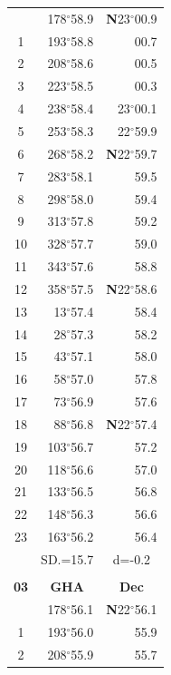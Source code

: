 \documentclass[10pt, a4paper]{report}
\begin{document}
\begin{scriptsize}
\begin{tabular*}{0.2\textwidth}[t]{@{\extracolsep{\fill}}|c|rr|}
\hline\rule{0pt}{2.6ex}\noindent
0 & 178$^\circ$58.9 & \textbf{N}23$^\circ$00.9\\
1 & 193$^\circ$58.8 & 00.7\\
2 & 208$^\circ$58.6 & 00.5\\
3 & 223$^\circ$58.5 & \raisebox{0.24ex}{\boldmath$\cdot$~\boldmath$\cdot$~~}00.3\\
4 & 238$^\circ$58.4 & 23$^\circ$00.1\\
5 & 253$^\circ$58.3 & 22$^\circ$59.9\\[2Pt]
6 & 268$^\circ$58.2 & \textbf{N}22$^\circ$59.7\\
7 & 283$^\circ$58.1 & 59.5\\
8 & 298$^\circ$58.0 & 59.4\\
9 & 313$^\circ$57.8 & \raisebox{0.24ex}{\boldmath$\cdot$~\boldmath$\cdot$~~}59.2\\
10 & 328$^\circ$57.7 & 59.0\\
11 & 343$^\circ$57.6 & 58.8\\[2Pt]
12 & 358$^\circ$57.5 & \textbf{N}22$^\circ$58.6\\
13 & 13$^\circ$57.4 & 58.4\\
14 & 28$^\circ$57.3 & 58.2\\
15 & 43$^\circ$57.1 & \raisebox{0.24ex}{\boldmath$\cdot$~\boldmath$\cdot$~~}58.0\\
16 & 58$^\circ$57.0 & 57.8\\
17 & 73$^\circ$56.9 & 57.6\\[2Pt]
18 & 88$^\circ$56.8 & \textbf{N}22$^\circ$57.4\\
19 & 103$^\circ$56.7 & 57.2\\
20 & 118$^\circ$56.6 & 57.0\\
21 & 133$^\circ$56.5 & \raisebox{0.24ex}{\boldmath$\cdot$~\boldmath$\cdot$~~}56.8\\
22 & 148$^\circ$56.3 & 56.6\\
23 & 163$^\circ$56.2 & 56.4\\
\hline
\rule{0pt}{2.4ex} & \multicolumn{1}{c}{SD.=15.7} & \multicolumn{1}{c|}{d=-0.2}\\
\hline
\multicolumn{1}{c}{}\\[-0.5ex]\hline
\multicolumn{1}{|c|}{\rule{0pt}{2.6ex}\textbf{03}} & \multicolumn{1}{c}{\textbf{GHA}} & \multicolumn{1}{c|}{\textbf{Dec}}\\
\hline\rule{0pt}{2.6ex}\noindent
0 & 178$^\circ$56.1 & \textbf{N}22$^\circ$56.1\\
1 & 193$^\circ$56.0 & 55.9\\
2 & 208$^\circ$55.9 & 55.7\\

\end{tabular*}
\end{scriptsize}
\end{document}
